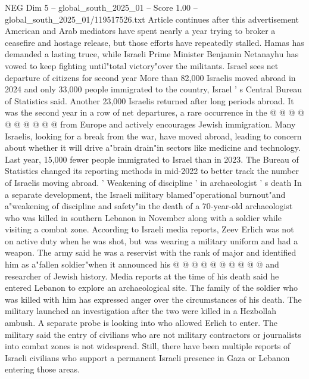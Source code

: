 \begin{textsample}{NEG Dim 5 – global\_south\_2025\_01 – Score 1.00 – global\_south\_2025\_01/119517526.txt}
Article continues after this advertisement American and Arab mediators have spent nearly a year trying to broker a ceasefire and hostage release, but those efforts have repeatedly stalled.
Hamas has demanded a lasting truce, while Israeli Prime Minister Benjamin Netanayhu has vowed to keep fighting until"total victory"over the militants.
Israel sees net departure of citizens for second year More than 82,000 Israelis moved abroad in 2024 and only 33,000 people immigrated to the country, Israel ' s Central Bureau of Statistics said.
Another 23,000 Israelis returned after long periods abroad.
It was the second year in a row of net departures, a rare occurrence in the @ @ @ @ @ @ @ @ @ @ from Europe and actively encourages Jewish immigration.
Many Israelis, looking for a break from the war, have moved abroad, leading to concern about whether it will drive a"brain drain"in sectors like medicine and technology.
Last year, 15,000 fewer people immigrated to Israel than in 2023.
The Bureau of Statistics changed its reporting methods in mid-2022 to better track the number of Israelis moving abroad. ' Weakening of discipline ' in archaeologist ' s death In a separate development, the Israeli military blamed"operational burnout"and a"weakening of discipline and safety"in the death of a 70-year-old archaeologist who was killed in southern Lebanon in November along with a soldier while visiting a combat zone.
According to Israeli media reports, Zeev Erlich was not on active duty when he was shot, but was wearing a military uniform and had a weapon.
The army said he was a reservist with the rank of major and identified him as a"fallen soldier"when it announced his @ @ @ @ @ @ @ @ @ @ and researcher of Jewish history.
Media reports at the time of his death said he entered Lebanon to explore an archaeological site.
The family of the soldier who was killed with him has expressed anger over the circumstances of his death.
The military launched an investigation after the two were killed in a Hezbollah ambush.
A separate probe is looking into who allowed Erlich to enter.
The military said the entry of civilians who are not military contractors or journalists into combat zones is not widespread.
Still, there have been multiple reports of Israeli civilians who support a permanent Israeli presence in Gaza or Lebanon entering those areas.

\end{textsample}

